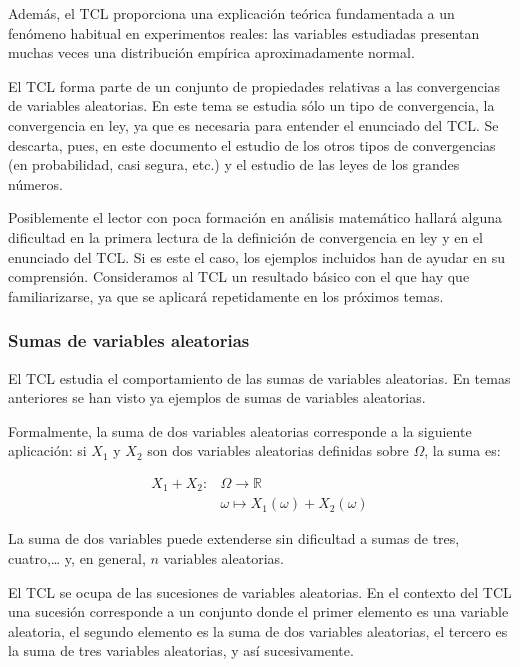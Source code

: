 \documentclass[
]{article}
\begin{document}
Además, el TCL proporciona una explicación teórica fundamentada a un fenómeno habitual en experimentos reales: las variables estudiadas presentan muchas veces una distribución empírica aproximadamente normal.

El TCL forma parte de un conjunto de propiedades relativas a las convergencias de variables aleatorias. En este tema se estudia sólo un tipo de convergencia, la convergencia en ley, ya que es necesaria para entender el enunciado del TCL. Se descarta, pues, en este documento el estudio de los otros tipos de convergencias (en probabilidad, casi segura, etc.) y el estudio de las leyes de los grandes números.

Posiblemente el lector con poca formación en análisis matemático hallará alguna dificultad en la primera lectura de la definición de convergencia en ley y en el enunciado del TCL. Si es este el caso, los ejemplos incluidos han de ayudar en su comprensión. Consideramos al TCL un resultado básico con el que hay que familiarizarse, ya que se aplicará repetidamente en los próximos temas.

\subsubsection{Sumas de variables aleatorias}\label{sumas-de-variables-aleatorias}

El TCL estudia el comportamiento de las sumas de variables aleatorias. En temas anteriores se han visto ya ejemplos de sumas de variables aleatorias.

Formalmente, la suma de dos variables aleatorias corresponde a la siguiente aplicación: si \(X_{1}\) y \(X_{2}\) son dos variables aleatorias definidas sobre \(\Omega\), la suma es:

\[
\begin{aligned}
X_{1}+X_{2}: & \Omega \rightarrow \mathbb{R} \\
& \omega \mapsto X_{1}(\omega)+X_{2}(\omega)
\end{aligned}
\]

La suma de dos variables puede extenderse sin dificultad a sumas de tres, cuatro,\ldots{} y, en general, \(n\) variables aleatorias.

El TCL se ocupa de las sucesiones de variables aleatorias. En el contexto del TCL una sucesión corresponde a un conjunto donde el primer elemento es una variable aleatoria, el segundo elemento es la suma de dos variables aleatorias, el tercero es la suma de tres variables aleatorias, y así sucesivamente.
\end{document}
